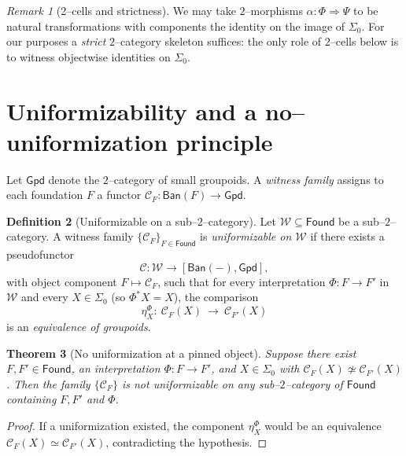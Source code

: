 \documentclass[11pt]{article}
\newtheorem{theorem}{Theorem}[section]
\theoremstyle{definition}
\newtheorem{definition}[theorem]{Definition}
\theoremstyle{remark}
\newtheorem{remark}[theorem]{Remark}
\newcommand{\Found}{\mathsf{Found}}
\newcommand{\Ban}{\mathsf{Ban}}
\newcommand{\Gpd}{\mathsf{Gpd}}
\newcommand{\SigmaZero}{\Sigma_{0}}
\begin{document}
\begin{remark}[2--cells and strictness]
We may take \(2\)--morphisms \(\alpha:\Phi\Rightarrow\Psi\) to be natural transformations with components the identity on the image of \(\SigmaZero\). For our purposes a \emph{strict} $2$--category skeleton suffices: the only role of $2$--cells below is to witness objectwise identities on \(\SigmaZero\).
\end{remark}

\section{Uniformizability and a no--uniformization principle}\label{sec:uniform}

Let \(\Gpd\) denote the $2$--category of small groupoids. A \emph{witness family} assigns to each foundation \(F\) a functor \(\mathcal C_F:\Ban(F)\to\Gpd\).

\begin{definition}[Uniformizable on a sub--$2$--category]
Let \(\mathcal W\subseteq\Found\) be a sub--$2$--category. A witness family \(\{\mathcal C_F\}_{F\in\Found}\) is \emph{uniformizable on \(\mathcal W\)} if there exists a pseudofunctor
\[
  \mathcal C:\mathcal W \longrightarrow [\Ban(-),\Gpd],
\]
with object component \(F\mapsto \mathcal C_F\), such that for every interpretation \(\Phi:F\to F'\) in \(\mathcal W\) and every \(X\in\SigmaZero\) (so \(\Phi^*X=X\)), the comparison
\[
  \eta^\Phi_X:\ \mathcal C_F(X)\ \longrightarrow\ \mathcal C_{F'}(X)
\]
is an \emph{equivalence of groupoids}.
\end{definition}

\begin{theorem}[No uniformization at a pinned object]\label{thm:no-unif}
Suppose there exist \(F,F'\in\Found\), an interpretation \(\Phi:F\to F'\), and \(X\in\SigmaZero\) with
\(\mathcal C_F(X)\not\simeq\mathcal C_{F'}(X)\).
Then the family \(\{\mathcal C_F\}\) is not uniformizable on any sub--$2$--category of \(\Found\) containing \(F,F'\) and \(\Phi\).
\end{theorem}

\begin{proof}
If a uniformization existed, the component \(\eta^\Phi_X\) would be an equivalence
\(\mathcal C_F(X)\simeq\mathcal C_{F'}(X)\), contradicting the hypothesis.
\end{proof}
\end{document}
